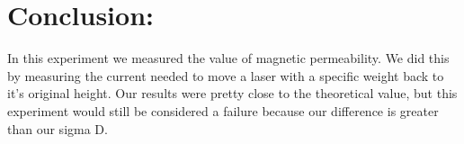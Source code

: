 \documentclass{article}
\begin{document}
  
  


\singlespace
\newpage

\section*{Conclusion:}
In this experiment we measured the value of magnetic permeability.  We did this by measuring the current needed to move a laser with a specific weight back to it's original height.  Our results were pretty close to the theoretical value, but this experiment would still be considered a failure because our difference is greater than our sigma D.
\end{document}
